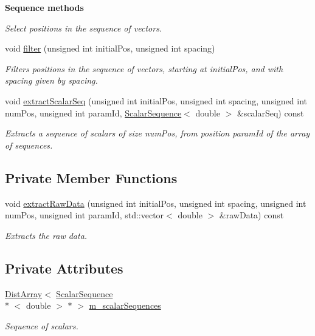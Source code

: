 \begin{Indent}{\bf Sequence methods}
\begin{DoxyCompactItemize}
\begin{DoxyCompactList}\small\item\em Select positions in the sequence of vectors. \end{DoxyCompactList}\item 
void \hyperlink{class_q_u_e_s_o_1_1_array_of_sequences_a7c95d24764af395fdff5c9d0c987e694}{filter} (unsigned int initial\-Pos, unsigned int spacing)
\begin{DoxyCompactList}\small\item\em Filters positions in the sequence of vectors, starting at {\ttfamily initial\-Pos}, and with spacing given by {\ttfamily spacing}. \end{DoxyCompactList}\item 
void \hyperlink{class_q_u_e_s_o_1_1_array_of_sequences_ab529b77aca8e169b1b769051e7de8c3d}{extract\-Scalar\-Seq} (unsigned int initial\-Pos, unsigned int spacing, unsigned int num\-Pos, unsigned int param\-Id, \hyperlink{class_q_u_e_s_o_1_1_scalar_sequence}{Scalar\-Sequence}$<$ double $>$ \&scalar\-Seq) const 
\begin{DoxyCompactList}\small\item\em Extracts a sequence of scalars of size {\ttfamily num\-Pos}, from position {\ttfamily param\-Id} of the array of sequences. \end{DoxyCompactList}\end{DoxyCompactItemize}
\end{Indent}
\subsection*{Private Member Functions}
\begin{DoxyCompactItemize}
\item 
void \hyperlink{class_q_u_e_s_o_1_1_array_of_sequences_a615df4add2396b94f5a4be3a5eb971fb}{extract\-Raw\-Data} (unsigned int initial\-Pos, unsigned int spacing, unsigned int num\-Pos, unsigned int param\-Id, std\-::vector$<$ double $>$ \&raw\-Data) const 
\begin{DoxyCompactList}\small\item\em Extracts the raw data. \end{DoxyCompactList}\end{DoxyCompactItemize}
\subsection*{Private Attributes}
\begin{DoxyCompactItemize}
\item 
\hyperlink{class_q_u_e_s_o_1_1_dist_array}{Dist\-Array}$<$ \hyperlink{class_q_u_e_s_o_1_1_scalar_sequence}{Scalar\-Sequence}\\*
$<$ double $>$ $\ast$ $>$ \hyperlink{class_q_u_e_s_o_1_1_array_of_sequences_a1f8047145ca75081c303bbbab5881119}{m\-\_\-scalar\-Sequences}
\begin{DoxyCompactList}\small\item\em Sequence of scalars. \end{DoxyCompactList}\end{DoxyCompactItemize}
